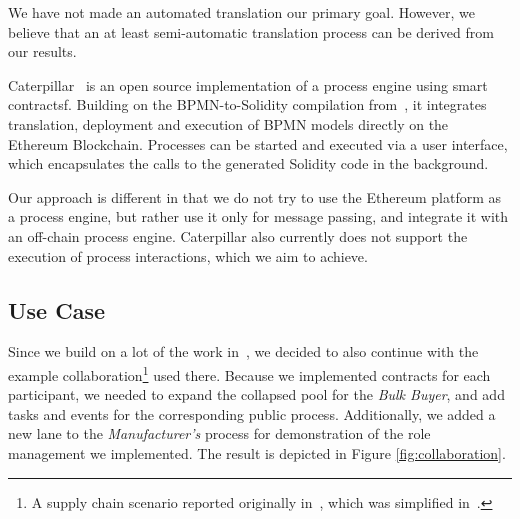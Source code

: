 \documentclass[runningheads]{llncs}
\begin{document}
We have not made an automated translation our primary goal.
However, we believe that an at least semi-automatic translation process can be derived from our results.

Caterpillar~\cite{lopez2017caterpillar} is an open source implementation of a process engine using smart contractsf.
Building on the BPMN-to-Solidity compilation from~\cite{weber2016untrusted}, it integrates translation, deployment and execution of BPMN models directly on the Ethereum Blockchain.
Processes can be started and executed via a user interface, which encapsulates the calls to the generated Solidity code in the background.

Our approach is different in that we do not try to use the Ethereum platform as a process engine, but rather use it only for message passing, and integrate it with an off-chain process engine.
Caterpillar also currently does not support the execution of process interactions, which we aim to achieve.

\subsection{Use Case}

Since we build on a lot of the work in~\cite{weber2016untrusted}, we decided to also continue with the example collaboration\footnote{A supply chain scenario reported originally in~\cite{fdhila2015collaborative}, which was simplified in~\cite{weber2016untrusted}.} used there.
Because we implemented contracts for each participant, we needed to expand the collapsed pool for the \emph{Bulk Buyer}, and add tasks and events for the corresponding public process.
Additionally, we added a new lane to the \emph{Manufacturer's} process for demonstration of the role management we implemented.
The result is depicted in Figure \ref{fig:collaboration}.

\end{document}
